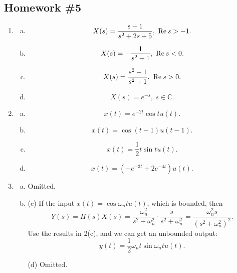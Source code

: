 \documentclass{article}
\renewcommand{\Re}{\text{Re}\hspace*{.2em}}
\newcommand{\Res}{\Re s}
\begin{document}
    \subsection*{Homework \#5}
        \begin{enumerate}
            \item 
            \begin{enumerate}[(a)]
                \item \[
                    X(s) = \frac{s+1}{s^2 +2s+5},\ \Res > -1.
                \]
                \item \[
                    X(s) = -\frac{1}{s^2 +1},\ \Res <0.
                \]
                \item \[
                    X(s) = \frac{s^2 -1}{s^2 +1},\ \Res > 0.
                \]
                \item \[
                    X(s) = e^{-s},\ s \in \mathbb{C}.
                \]
            \end{enumerate}	
            
            \item 
            \begin{enumerate}[(a)]
                \item \[
                    x(t) = e^{-2t} \cos t u(t).  
                \]
                \item \[
                    x(t) = \cos(t - 1) u(t - 1).  
                \]
                \item \[
                    x(t) = \frac{1}{2}t\sin t u(t).  
                \]
                \item \[
                    x(t) = (-e^{-3t} + 2 e^{-4 t})u(t).  
                \]
            \end{enumerate}
            
            \item 
            \begin{enumerate}[(a)]
                \item Omitted.
                \item (c) If the input $x(t) = \cos\omega_nt u(t)$, which is bounded, then \[
                    Y(s) = H(s)X(s) = \frac{\omega_n^2 }{s^2 +\omega_n^2 }\cdot \frac{s}{s^2 +\omega_n^2} = \frac{\omega_n^2 s}{(s^2 +\omega_n^2)^2}.
                \]
                Use the results in 2(c), and we can get an unbounded output: \[
                    y(t) = \frac{1}{2}\omega_nt\sin\omega_nt u(t).
                \]
                \item[(d)] Omitted.
            \end{enumerate}
            

\end{enumerate}
\end{document}
